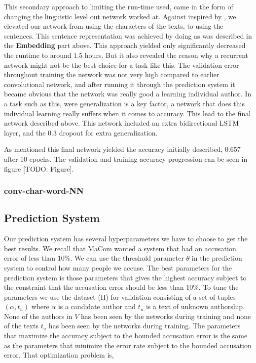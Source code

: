 This secondary approach to limiting the run-time used, came in the form of
changing the linguistic level out network worked at. Against inspired by
\cite{qian:2018}, we elevated our network from using the characters of the
texts, to using the sentences. This sentence representation was achieved by
doing as was described in the \textbf{Embedding} part above. This approach
yielded only significantly decreased the runtime to around $1.5$ hours. But it
also revealed the reason why a recurrent network might not be the best choice
for a task like this. The validation error throughout training the network was
not very high compared to earlier convolutional network, and after running it
through the prediction system it became obvious that the network was really good
a learning individual author. In a task such as this, were generalization is a
key factor, a network that does this individual learning really suffers when it
comes to accuracy. This lead to the final network described above. This network
included an extra bidirectional \gls{LSTM} layer, and the 0.3 dropout for extra
generalization.

As mentioned this final network yielded the accuracy initially described,
0.657 after 10 epochs. The validation and training accuracy progression can be
seen in figure [TODO: Figure].

\subsubsection{\glsdesc{conv-char-word-NN}}
\label{subsubsec:conv_char_word_nn}

\subsection{Prediction System}

Our prediction system has several hyperparameters we have to choose to get
the best results. We recall that MaCom wanted a system that had an accusation
error of less than 10\%. We can use the threshold parameter $\theta$ in the
prediction system to control how many people we accuse. The best parameters
for the prediction system is those parameters that gives the highest accuracy
subject to the constraint that the accusation error should be less than 10\%. To
tune the parameters we use the dataset (H) for validation consisting of a set of
tuples $(\alpha, t_u)$ where $\alpha$ is a candidate author and $t_u$ is a text
of unknown authorship. None of the authors in $V$ has been seen by the networks
during training and none of the texts $t_u$ has been seen by the networks during
training. The parameters that maximize the accuracy subject to the bounded
accusation error is the same as the parameters that minimize the error rate
subject to the bounded accusation error. That optimization problem is,

